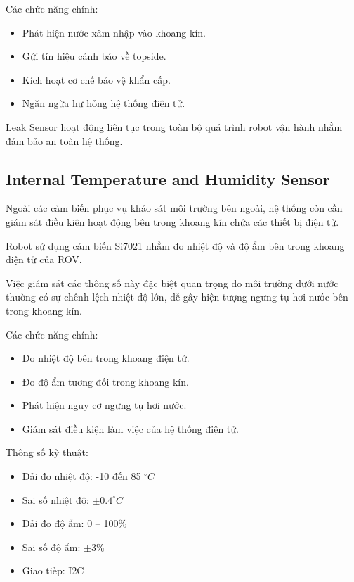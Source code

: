 \documentclass[../DoAn.tex]{subfiles}
\begin{document}
Các chức năng chính:

\begin{itemize}
    \item Phát hiện nước xâm nhập vào khoang kín.
    \item Gửi tín hiệu cảnh báo về topside.
    \item Kích hoạt cơ chế bảo vệ khẩn cấp.
    \item Ngăn ngừa hư hỏng hệ thống điện tử.
\end{itemize}

Leak Sensor hoạt động liên tục trong toàn bộ quá trình robot vận hành nhằm đảm bảo an toàn hệ thống.

\subsection{Internal Temperature and Humidity Sensor}

Ngoài các cảm biến phục vụ khảo sát môi trường bên ngoài, hệ thống còn cần giám sát điều kiện hoạt động bên trong khoang kín chứa các thiết bị điện tử.

Robot sử dụng cảm biến Si7021 nhằm đo nhiệt độ và độ ẩm bên trong khoang điện tử của ROV.

Việc giám sát các thông số này đặc biệt quan trọng do môi trường dưới nước thường có sự chênh lệch nhiệt độ lớn, dễ gây hiện tượng ngưng tụ hơi nước bên trong khoang kín.

Các chức năng chính:

\begin{itemize}
    \item Đo nhiệt độ bên trong khoang điện tử.
    \item Đo độ ẩm tương đối trong khoang kín.
    \item Phát hiện nguy cơ ngưng tụ hơi nước.
    \item Giám sát điều kiện làm việc của hệ thống điện tử.
\end{itemize}

Thông số kỹ thuật:

\begin{itemize}
    \item Dải đo nhiệt độ: -10 đến 85 $^\circ C$
    \item Sai số nhiệt độ: $\pm0.4 ^\circ C$
    \item Dải đo độ ẩm: 0 -- 100\%
    \item Sai số độ ẩm: $\pm3\%$
    \item Giao tiếp: I2C
\end{itemize}
\end{document}
